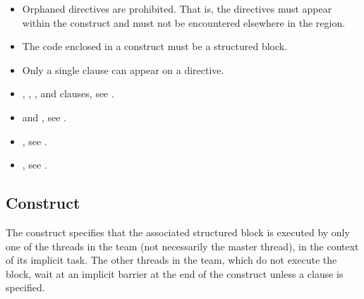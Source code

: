 \begin{itemize}
\item Orphaned  directives are prohibited. That is, the  directives must 
appear within the  construct and must not be encountered elsewhere in the 
 region.

\item The code enclosed in a  construct must be a structured block. 

\item Only a single  clause can appear on a  directive.

\end{itemize}

\crossreferences
\begin{itemize}
\item {}, , , and  clauses, see 
.

\item {} and , see
  .

\item {}, see .

\item {}, see 
.
\end{itemize}










\subsection{ Construct}
\label{subsec:single Construct}
\summary
The  construct specifies that the associated structured block is executed by only 
one of the threads in the team (not necessarily the master thread), in the context of its 
implicit task. The other threads in the team, which do not execute the block, wait at an 
implicit barrier at the end of the  construct unless a  clause is specified.

